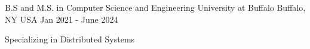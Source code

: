 

\begin{cventries}


  \cventry
    {B.S and M.S. in Computer Science and Engineering} %
    {University at Buffalo} %
    {Buffalo, NY USA} %
    {Jan 2021 - June 2024} %
    {
      \begin{cvitems} %
        \item {Specializing in Distributed Systems}
      \end{cvitems}
    }



\end{cventries}
